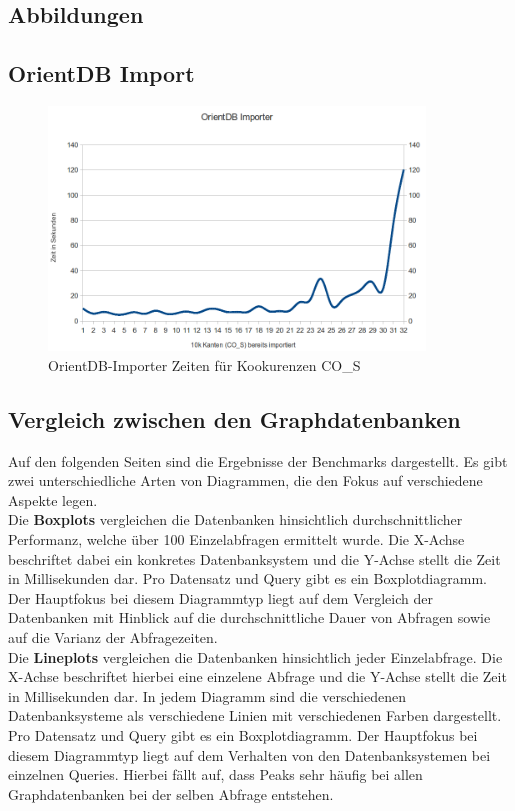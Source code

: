 \documentclass[11pt, a4paper, oneside]{article} %
\begin{document}
\begin{appendix}
\section{Abbildungen}
\subsection{OrientDB Import}
\begin{figure}[htbp]
	\centering
	\includegraphics[width=10cm]{OrientImporter.png} 
	\caption{OrientDB-Importer Zeiten für Kookurenzen CO\_{}S}
	\label{fig:orientdb_import}
\end{figure}

\subsection{Vergleich zwischen den Graphdatenbanken}
Auf den folgenden Seiten sind die Ergebnisse der Benchmarks dargestellt. Es gibt zwei unterschiedliche Arten von Diagrammen, die den Fokus auf verschiedene Aspekte legen. \\
Die \textbf{Boxplots} vergleichen die Datenbanken hinsichtlich durchschnittlicher Performanz, welche über 100 Einzelabfragen ermittelt wurde. Die X-Achse beschriftet dabei ein konkretes Datenbanksystem und die Y-Achse stellt die Zeit in Millisekunden dar. Pro Datensatz und Query gibt es ein Boxplotdiagramm. Der Hauptfokus bei diesem Diagrammtyp liegt auf dem Vergleich der Datenbanken mit Hinblick auf die durchschnittliche Dauer von Abfragen sowie auf die Varianz der Abfragezeiten.\\
Die \textbf{Lineplots} vergleichen die Datenbanken hinsichtlich jeder Einzelabfrage. Die X-Achse beschriftet hierbei eine einzelene Abfrage und die Y-Achse stellt die Zeit in Millisekunden dar. In jedem Diagramm sind die verschiedenen Datenbanksysteme als verschiedene Linien mit verschiedenen Farben dargestellt. Pro Datensatz und Query gibt es ein Boxplotdiagramm. Der Hauptfokus bei diesem Diagrammtyp liegt auf dem Verhalten von den Datenbanksystemen bei einzelnen Queries. Hierbei fällt auf, dass Peaks sehr häufig bei allen Graphdatenbanken bei der selben Abfrage entstehen.


\end{appendix}
\end{document}
